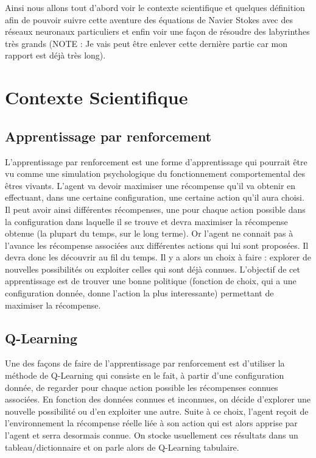 \documentclass[12pt]{article}
\begin{document}
Ainsi nous allons tout d'abord voir le contexte scientifique et quelques définition afin de pouvoir suivre cette aventure des équations de Navier Stokes avec des réseaux neuronaux particuliers et enfin voir une façon de résoudre des labyrinthes très grands (NOTE : Je vais peut être enlever cette dernière partie car mon rapport est déjà très long).

\section{Contexte Scientifique}
\subsection{Apprentissage par renforcement}
L'apprentissage par renforcement est une forme d'apprentissage qui pourrait être vu comme une simulation psychologique du fonctionnement comportemental des êtres vivants. L'agent va devoir maximiser une récompense qu'il va obtenir en effectuant, dans une certaine configuration, une certaine action qu'il aura choisi. Il peut avoir ainsi différentes récompenses, une pour chaque action possible dans la configuration dans laquelle il se trouve et devra maximiser la récompense obtenue (la plupart du temps, sur le long terme). Or l'agent ne connait pas à l'avance les récompense associées aux différentes actions qui lui sont proposées. Il devra donc les découvrir au fil du temps. Il y a alors un choix à faire : explorer de nouvelles possibilités ou exploiter celles qui sont déjà connues. L'objectif de cet apprentissage est de trouver une bonne politique (fonction de choix, qui a une configuration donnée, donne l'action la plus interessante) permettant de maximiser la récompense.
\subsection{Q-Learning}
Une des façons de faire de l'apprentissage par renforcement est d'utiliser la méthode de Q-Learning qui consiste en le fait, à partir d'une configuration donnée, de regarder pour chaque action possible les récompenses connues associées. En fonction des données connues et inconnues, on décide d'explorer une nouvelle possibilité ou d'en exploiter une autre. Suite à ce choix, l'agent reçoit de l'environnement la récompense réelle liée à son action qui est alors apprise par l'agent et serra desormais connue. On stocke usuellement ces résultats dans un tableau/dictionnaire et on parle alors de Q-Learning tabulaire.
\end{document}
